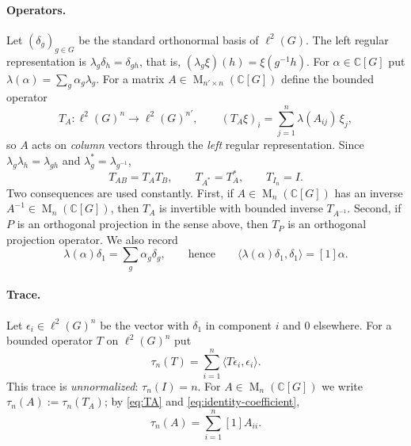 \documentclass[11pt]{article}
\theoremstyle{remark}
\numberwithin{equation}{section}
\newcommand{\C}{\mathbb C}
\newcommand{\Mat}{\operatorname{M}}
\begin{document}
\paragraph{Operators.}
Let $(\delta_g)_{g\in G}$ be the standard orthonormal basis of $\ell^2(G)$. The left regular representation is $\lambda_g\delta_h=\delta_{gh}$, that is, $(\lambda_g\xi)(h)=\xi(g^{-1}h)$. For $\alpha\in\C[G]$ put $\lambda(\alpha)=\sum_g\alpha_g\lambda_g$. For a matrix $A\in\Mat_{n'\times n}(\C[G])$ define the bounded operator
\begin{equation}\label{eq:TA}
 T_A:\ell^2(G)^n\to\ell^2(G)^{n'},\qquad (T_A\xi)_i=\sum_{j=1}^n\lambda(A_{ij})\,\xi_j ,
\end{equation}
so $A$ acts on \emph{column} vectors through the \emph{left} regular representation. Since $\lambda_g\lambda_h=\lambda_{gh}$ and $\lambda_g^*=\lambda_{g^{-1}}$,
\begin{equation}\label{eq:star-hom}
 T_{AB}=T_AT_B,\qquad T_{A^*}=T_A^*,\qquad T_{I_n}=I .
\end{equation}
Two consequences are used constantly. First, if $A\in\Mat_n(\C[G])$ has an inverse $A^{-1}\in\Mat_n(\C[G])$, then $T_A$ is invertible with bounded inverse $T_{A^{-1}}$. Second, if $P$ is an orthogonal projection in the sense above, then $T_P$ is an orthogonal projection operator. We also record
\begin{equation}\label{eq:identity-coefficient}
 \lambda(\alpha)\delta_1=\sum_g\alpha_g\delta_g,\qquad\text{hence}\qquad \langle\lambda(\alpha)\delta_1,\delta_1\rangle=[1]\alpha .
\end{equation}

\paragraph{Trace.}
Let $\epsilon_i\in\ell^2(G)^n$ be the vector with $\delta_1$ in component $i$ and $0$ elsewhere. For a bounded operator $T$ on $\ell^2(G)^n$ put
\[
 \tau_n(T)=\sum_{i=1}^n\langle T\epsilon_i,\epsilon_i\rangle .
\]
This trace is \emph{unnormalized}: $\tau_n(I)=n$. For $A\in\Mat_n(\C[G])$ we write $\tau_n(A):=\tau_n(T_A)$; by \eqref{eq:TA} and \eqref{eq:identity-coefficient},
\begin{equation}\label{eq:trace-coefficient}
 \tau_n(A)=\sum_{i=1}^n[1]A_{ii}.
\end{equation}
\end{document}
